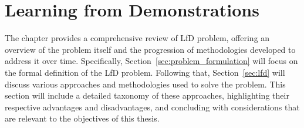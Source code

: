 \section{Learning from Demonstrations}
\label{sec:sota}
The chapter provides a comprehensive review of LfD problem, offering an overview of the problem itself and the progression of methodologies developed to address it over time. Specifically, Section~\ref{sec:problem_formulation} will focus on the formal definition of the LfD problem. Following that, Section~\ref{sec:lfd} will discuss various approaches and methodologies used to solve the problem. This section will include a detailed taxonomy of these approaches, highlighting their respective advantages and disadvantages, and concluding with considerations that are relevant to the objectives of this thesis.


% 